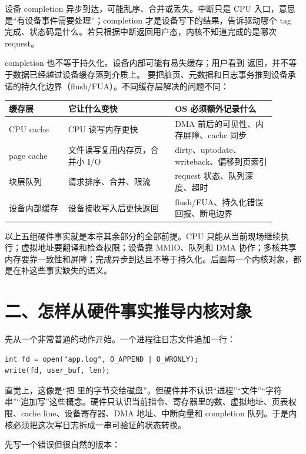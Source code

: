设备 completion 异步到达，可能乱序、合并或丢失。中断只是 CPU 入口，意思是“有设备事件需要处理”；completion 才是设备写下的结果，告诉驱动哪个 tag 完成、状态码是什么。若只根据中断返回用户态，内核不知道完成的是哪次 request。

completion 也不等于持久化。设备内部可能有易失缓存；用户看到  返回，并不等于数据已经越过设备缓存落到介质上。 要把脏页、元数据和日志事务推到设备承诺的持久化边界（flush/FUA）。不同缓存层解决的问题不同：

\begin{longtable}{p{0.2\linewidth}p{0.36\linewidth}p{0.34\linewidth}}
\toprule
缓存层 & 它让什么变快 & OS 必须额外记录什么 \\
\midrule
CPU cache & CPU 读写内存更快 & DMA 前后的可见性、内存屏障、cache 同步 \\
page cache & 文件读写复用内存页，合并小 I/O & dirty、uptodate、writeback、偏移到页索引 \\
块层队列 & 请求排序、合并、限流 & request 状态、队列深度、超时 \\
设备内部缓存 & 设备接收写入后更快返回 & flush/FUA、持久化错误回报、断电边界 \\
\bottomrule
\end{longtable}

\begin{keyidea}
以上五组硬件事实就是本章其余部分的全部前提。CPU 只能从当前现场继续执行；虚拟地址要翻译和检查权限；设备靠 MMIO、队列和 DMA 协作；多核共享内存要靠一致性和屏障；完成异步到达且不等于持久化。后面每一个内核对象，都是在补这些事实缺失的语义。
\end{keyidea}

\section{二、怎样从硬件事实推导内核对象}

先从一个非常普通的动作开始。一个进程往日志文件追加一行：

\begin{lstlisting}
int fd = open("app.log", O_APPEND | O_WRONLY);
write(fd, user_buf, len);
\end{lstlisting}

直觉上，这像是“把  里的字节交给磁盘”。但硬件并不认识“进程”“文件”“字符串”“追加写”这些概念。硬件只认识当前指令、寄存器里的数、虚拟地址、页表权限、cache line、设备寄存器、DMA 地址、中断向量和 completion 队列。于是内核必须把这次写日志拆成一串可验证的状态转换。

先写一个错误但很自然的版本：

